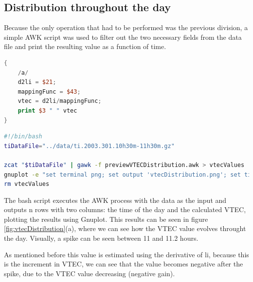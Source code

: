 \subsection{Distribution throughout the day}

Because the only operation that had to be performed was the previous division, a simple AWK script was used to filter out the two necessary fields from the data file and print the resulting value as a function of time. 

\begin{lstlisting}[language=Awk, caption=AWK script to estimate the VTEC]
{
	/a/
	d2li = $21;
	mappingFunc = $43;
	vtec = d2li/mappingFunc;
	print $3 " " vtec
}
\end{lstlisting}

\begin{lstlisting}[language=Bash, caption=Bash script to execute the procedures]
#!/bin/bash
tiDataFile="../data/ti.2003.301.10h30m-11h30m.gz"

zcat "$tiDataFile" | gawk -f previewVTECDistribution.awk > vtecValues
gnuplot -e "set terminal png; set output 'vtecDistribution.png'; set title 'VTEC Distribution'; set xlabel 'Time of the day (hours)'; set ylabel 'VTEC'; set grid; plot \"vtecValues\" using 1:2 with point"
rm vtecValues
\end{lstlisting}
\clearpage

The bash script executes the AWK process with the data as the input and outputs n rows with two columns: the time of the day and the calculated VTEC, plotting the results using Gnuplot. 
This results can be seen in figure \ref{fig:vtecDistribution}(a), where we can see how the VTEC value evolves throught the day. Visually, a spike can be seen between 11 and 11.2 hours. 

As mentioned before this value is estimated using the derivative of li, because this is the increment in VTEC, we can see that the value becomes negative after the spike, due to the VTEC value decreasing (negative gain).

